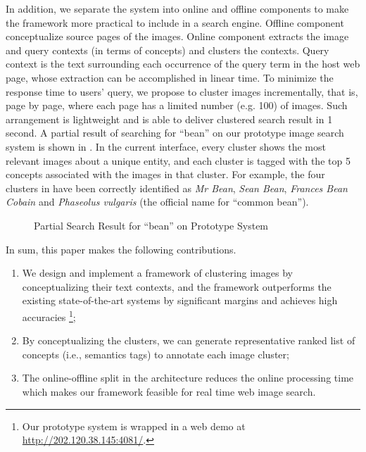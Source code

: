 In addition, we separate the system into online and offline
components to make the framework more practical to include in a search engine.
Offline component conceptualize source pages of the images.
Online component extracts the image and query contexts (in terms of
concepts) and clusters the contexts.
Query context is the text surrounding each occurrence of the query term
in the host web page, whose extraction can be accomplished in linear time.
To minimize the response time to users' query,
we propose to cluster images incrementally, that is,
page by page, where each page has a limited number
(e.g. 100) of images. Such arrangement is lightweight and is
able to deliver clustered search result in 1 second. 
A partial result of searching for ``bean'' on our prototype image search system
is shown in . In the current interface, every cluster shows the
most relevant images about a unique entity, and each cluster is tagged with
the top 5 concepts associated with the images in that cluster. For example, 
the four clusters in  have been correctly identified
as {\em Mr Bean}, {\em Sean Bean}, {\em Frances Bean Cobain} and {\em Phaseolus vulgaris}
(the official name for ``common bean'').

\begin{figure}[th]
\centerline{}
\caption{Partial Search Result for ``bean'' on Prototype System}
\label{fig:demo-bean}
\end{figure}

In sum, this paper makes the following contributions.
\begin{enumerate}
\item We design and implement a framework of clustering images by
conceptualizing their text contexts, and the framework
outperforms the existing state-of-the-art systems by significant margins
and achieves high accuracies
\footnote{Our prototype system is wrapped in a web demo 
at \url{http://202.120.38.145:4081/}.};
\item By conceptualizing the clusters, we can generate representative
ranked list of concepts (i.e., semantics tags) to annotate each image cluster;
\item The online-offline split in the architecture reduces the online
processing time which makes our framework feasible for real time web image search.
\end{enumerate}

